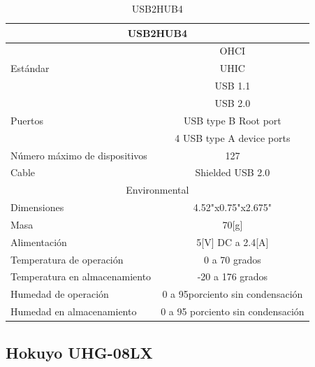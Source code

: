 \documentclass[a4paper]{book}
\begin{document}
\begin{table}[H]
\begin{center}
\begin{tabular}{|l|l|}%


\hline
\multicolumn{2}{|c|}{USB2HUB4} \\ \hline %
\multirow{3}{1cm}{Estándar} & \multicolumn{1}{|c|}{OHCI}\\ & \multicolumn{1}{|c|}{UHIC}\\ & \multicolumn{1}{|c|}{USB 1.1}\\ & \multicolumn{1}{|c|}{USB 2.0}\\ \hline
Puertos & \multicolumn{1}{|c|}{USB type B Root port}\\ &\multicolumn{1}{|c|}{4 USB type A device ports}\\ \hline
Número máximo de dispositivos & \multicolumn{1}{|c|}{127}\\ \hline
Cable & \multicolumn{1}{|c|}{Shielded USB 2.0}\\ \hline
\multicolumn{2}{|c|}{Environmental}\\ \hline
Dimensiones & \multicolumn{1}{|c|}{4.52"x0.75"x2.675"}\\ \hline
Masa & \multicolumn{1}{|c|}{70[g]}\\ \hline
Alimentación & \multicolumn{1}{|c|}{5[V] DC a 2.4[A]}\\ \hline
Temperatura de operación & \multicolumn{1}{|c|}{0 a 70 grados}\\ \hline
Temperatura en almacenamiento & \multicolumn{1}{|c|}{-20 a 176 grados}\\ \hline
Humedad de operación & \multicolumn{1}{|c|}{0 a 95porciento sin condensación}\\ \hline
Humedad en almacenamiento & \multicolumn{1}{|c|}{0 a 95 porciento sin condensación}\\ \hline

\end{tabular}
\caption{USB2HUB4}
\label{Datos del USB2HUB4}
\end{center}
\end{table}

\subsection{Hokuyo UHG-08LX}
\end{document}
